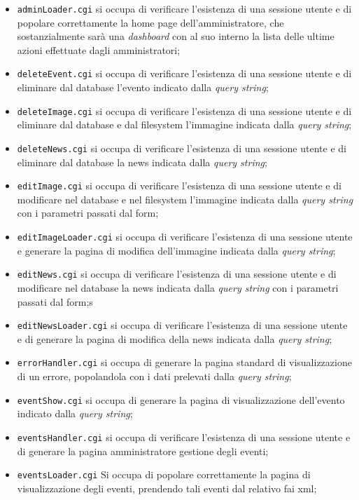 \begin{itemize}

	\item \texttt{adminLoader.cgi} si occupa di verificare l'esistenza di una sessione utente e di popolare correttamente la home page dell'amministratore, che sostanzialmente sarà una \textit{dashboard} con al suo interno la lista delle ultime azioni effettuate dagli amministratori;
	\item \texttt{deleteEvent.cgi} si occupa di verificare l'esistenza di una sessione utente e di eliminare dal database l'evento indicato dalla \textit{query string};
	\item \texttt{deleteImage.cgi} si occupa di verificare l'esistenza di una sessione utente e di eliminare dal database e dal filesystem l'immagine indicata dalla \textit{query string};
	\item \texttt{deleteNews.cgi} si occupa di verificare l'esistenza di una sessione utente e di eliminare dal database la news indicata dalla \textit{query string};
	\item \texttt{editImage.cgi} si occupa di verificare l'esistenza di una sessione utente e di modificare nel database e nel filesystem l'immagine indicata dalla \textit{query string} con i parametri passati dal form;
	\item \texttt{editImageLoader.cgi} si occupa di verificare l'esistenza di una sessione utente e generare la pagina di modifica dell'immagine indicata dalla \textit{query string};
	\item \texttt{editNews.cgi} si occupa di verificare l'esistenza di una sessione utente e di modificare nel database la news indicata dalla \textit{query string} con i parametri passati dal form;s
	\item \texttt{editNewsLoader.cgi} si occupa di verificare l'esistenza di una sessione utente e di generare la pagina di modifica della news indicata dalla \textit{query string};
	\item \texttt{errorHandler.cgi} si occupa di generare la pagina standard di visualizzazione di un errore, popolandola con i dati prelevati dalla \textit{query string};
	\item \texttt{eventShow.cgi} si occupa di generare la pagina di visualizzazione dell'evento indicato dalla \textit{query string};
	\item \texttt{eventsHandler.cgi} si occupa di verificare l'esistenza di una sessione utente e di generare la pagina amministratore gestione degli eventi;
\item \texttt{eventsLoader.cgi} Si occupa di popolare correttamente la pagina di visualizzazione degli eventi, prendendo tali eventi dal relativo fai xml;

\end{itemize}
